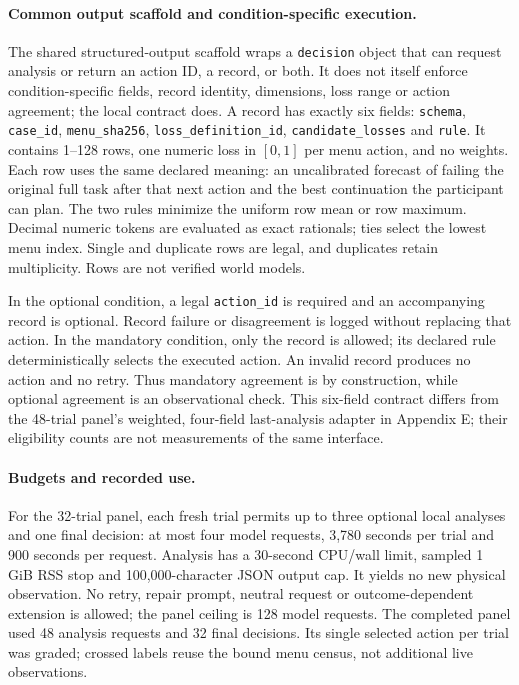 \paragraph{Common output scaffold and condition-specific execution.}
The shared structured-output scaffold wraps a \texttt{decision} object
that can request analysis or return an action ID, a record, or both.
It does not itself enforce condition-specific fields, record identity,
dimensions, loss range or action agreement; the local contract does.
A record has exactly six fields: \texttt{schema}, \texttt{case\_id},
\texttt{menu\_sha256}, \texttt{loss\_definition\_id},
\texttt{candidate\_losses} and \texttt{rule}. It contains 1--128 rows,
one numeric loss in $[0,1]$ per menu action, and no weights. Each row
uses the same declared meaning: an uncalibrated forecast of failing the
original full task after that next action and the best continuation the
participant can plan. The two rules minimize the uniform row mean or
row maximum. Decimal numeric tokens are evaluated as exact rationals;
ties select the lowest menu index. Single and duplicate rows are legal,
and duplicates retain multiplicity. Rows are not verified world models.

In the optional condition, a legal \texttt{action\_id} is required and
an accompanying record is optional. Record failure or disagreement is
logged without replacing that action. In the mandatory condition, only
the record is allowed; its declared rule deterministically selects the
executed action. An invalid record produces no action and no retry.
Thus mandatory agreement is by construction, while optional agreement
is an observational check. This six-field contract differs from the
48-trial panel's weighted, four-field last-analysis adapter in Appendix E;
their eligibility counts are not measurements of the same interface.

\paragraph{Budgets and recorded use.}
For the 32-trial panel, each fresh trial permits up to three optional
local analyses and one final decision: at most four model requests,
3,780 seconds per trial and 900 seconds per request. Analysis has a
30-second CPU/wall limit, sampled 1 GiB RSS stop and 100,000-character
JSON output cap. It yields no new physical observation. No retry,
repair prompt, neutral request or outcome-dependent extension is
allowed; the panel ceiling is 128 model requests. The completed panel
used 48 analysis requests and 32 final decisions. Its single selected
action per trial was graded; crossed labels reuse the bound menu census,
not additional live observations.

